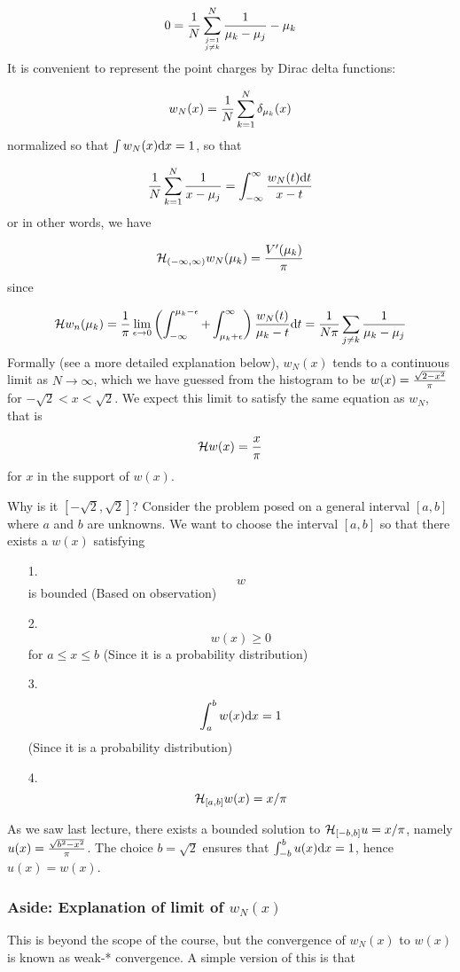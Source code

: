\documentclass[12pt,landscape]{article}
\def\D{ {\rm d} }
\def\HH{ {\cal H} }
\def\dx{\D x}
\def\dt{\D t}
\begin{document}
{\[
0 = {1 \over N} \sum_{j=1 \atop j \neq k}^N {1 \over \mu_k -\mu_j} -  \mu_k
\]
It is convenient to represent the point charges by Dirac delta functions:

\[
    w_N(x) = {1 \over N} \sum_{k=1}^N \delta_{\mu_k}(x)
\]
normalized so that $\int w_N(x) \dx = 1$, so that

\[
    {1 \over N} \sum_{k=1}^N {1 \over  x -\mu_j} = \int_{-\infty}^\infty {w_N(t) \dt \over x - t}
\]
or in other words, we have

\[
 \HH_{(-\infty,\infty)} w_N(\mu_k) = {V'(\mu_k) \over \pi}
\]
since

\[
\HH w_n (\mu_k) = {1 \over \pi} \lim_{\epsilon\rightarrow 0} \left(\int_{-\infty}^{\mu_k-\epsilon} + \int_{\mu_k+\epsilon}^\infty\right) {w_N(t)  \over  \mu_k-t} \dt  = {1 \over N\pi} \sum_{j \neq k} {1 \over \mu_k - \mu_j}
\]
Formally (see a more detailed explanation below), $w_N(x)$ tends to a continuous limit as $N\rightarrow \infty$, which we have guessed from the histogram to be $w(x) = { \sqrt{2-x^2}  \over \pi}$ for $-\sqrt 2 < x < \sqrt2$. We expect this limit to satisfy the same equation as $w_N$, that is

\[
 \HH w(x) = {x \over \pi}
\]
for $x$ in the support of $w(x)$.

Why is it $[-\sqrt 2, \sqrt 2]$? Consider the problem posed on a general interval $[a,b]$ where $a$ and $b$ are unknowns. We  want to choose the interval $[a,b]$ so that there exists a $w(x)$  satisfying

\begin{itemize}
\item[1. ] \[
w
\]
is bounded (Based on observation)


\item[2. ] \[
w(x) \geq 0
\]
for $a \leq x \leq b$ (Since it is a probability distribution)


\item[3. ] \[
\int_a^b w(x) \dx = 1
\]
(Since it is a probability distribution)


\item[4. ] \[
\HH_{[a,b]} w(x) = x/\pi
\]
\end{itemize}
As we saw last lecture, there exists a bounded solution to $\HH_{[-b,b]} u =  x/\pi$, namely  $u(x) = { \sqrt{b^2-x^2} \over \pi}$. The choice $b = \sqrt{2}$ ensures that $\int_{-b}^b u(x) \dx = 1$, hence $u(x) = w(x)$.

\subsubsection{Aside: Explanation of limit of $w_N(x)$}
This is beyond the scope of the course, but the convergence of $w_N(x)$ to $w(x)$ is known as weak-* convergence. A simple version of this is that

}
\end{document}
